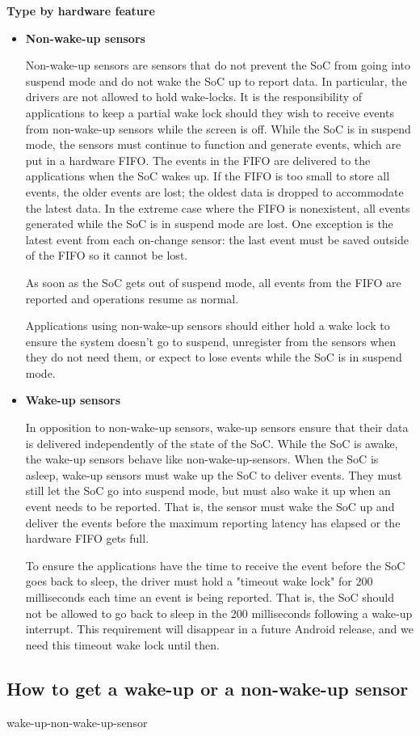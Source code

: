 \textbf{Type by hardware feature}
\begin{itemize}
\item \textbf{Non-wake-up sensors}

  Non-wake-up sensors are sensors that do not prevent the SoC from going into
  suspend mode and do not wake the SoC up to report data. In particular, the
  drivers are not allowed to hold wake-locks. It is the responsibility of
  applications to keep a partial wake lock should they wish to receive events
  from non-wake-up sensors while the screen is off. While the SoC is in suspend
  mode, the sensors must continue to function and generate events, which are put
  in a hardware FIFO.
  The events in the FIFO are delivered to the applications when the SoC wakes
  up. If the FIFO is too small to store all events, the older events are lost;
  the oldest data is dropped to accommodate the latest data. In the extreme case
  where the FIFO is nonexistent, all events generated while the SoC is in
  suspend mode are lost. One exception is the latest event from each on-change
  sensor: the last event must be saved outside of the FIFO so it cannot be lost.

  As soon as the SoC gets out of suspend mode, all events from the FIFO are
  reported and operations resume as normal.

  Applications using non-wake-up sensors should either hold a wake lock to
  ensure the system doesn't go to suspend, unregister from the sensors when they
  do not need them, or expect to lose events while the SoC is in suspend mode.

\item \textbf{Wake-up sensors}

  In opposition to non-wake-up sensors, wake-up sensors ensure that their data
  is delivered independently of the state of the SoC. While the SoC is awake,
  the wake-up sensors behave like non-wake-up-sensors. When the SoC is asleep,
  wake-up sensors must wake up the SoC to deliver events. They must still let
  the SoC go into suspend mode, but must also wake it up when an event needs to
  be reported. That is, the sensor must wake the SoC up and deliver the events
  before the maximum reporting latency has elapsed or the hardware FIFO gets
  full. %

  To ensure the applications have the time to receive the event before the SoC
  goes back to sleep, the driver must hold a "timeout wake lock" for 200
  milliseconds each time an event is being reported. That is, the SoC should not
  be allowed to go back to sleep in the 200 milliseconds following a wake-up
  interrupt. This requirement will disappear in a future Android release, and we
  need this timeout wake lock until then.
\end{itemize}

\subsection{How to get a wake-up or a non-wake-up sensor}

{wake-up-non-wake-up-sensor}








